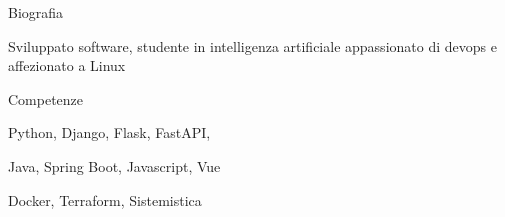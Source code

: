 \documentclass{cv} %
\def\sidespacing{0.5cm}
\begin{document}
\begin{minipage}[b][0.9\paperheight][t]{0.29\linewidth}

    \begin{minipage}[c]{\linewidth}
        \centering
    \end{minipage}

    \vspace{\sidespacing}

    \begin{rSection}{Biografia}
        \item Sviluppato software, studente in intelligenza artificiale
        appassionato di devops
        e affezionato a Linux
    \end{rSection}

    \vspace{\sidespacing}

    \begin{rSection}{Competenze}
        \item Python, Django, Flask, FastAPI,
        \item Java, Spring Boot, Javascript, Vue
        \item Docker, Terraform, Sistemistica
    \end{rSection}


\end{minipage}
\end{document}
